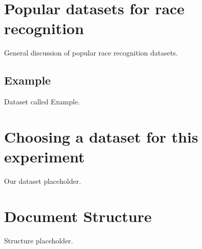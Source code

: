 \section{Popular datasets for race recognition}
\label{introduction:datasets}
General discussion of popular race recognition datasets.
\subsection{Example}
\label{introduction:datasets:example}
Dataset called Example.

\section{Choosing a dataset for this experiment}
\label{introduction:ourdataset} 
Our dataset placeholder.

\section{Document Structure}
\label{introduction:structure} 
Structure placeholder.




